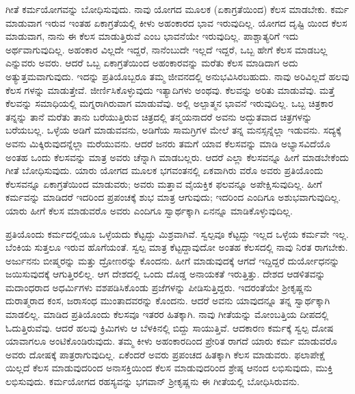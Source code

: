 ಗೀತೆ ಕರ್ಮಯೋಗವನ್ನು ಬೋಧಿಸುವುದು. ನಾವು ಯೋಗದ ಮೂಲಕ (ಏಕಾಗ್ರತೆಯಿಂದ) ಕೆಲಸ ಮಾಡಬೇಕು. ಕರ್ಮ ಮಾಡುವಾಗ ಇರುವ ಇಂತಹ ಏಕಾಗ್ರತೆಯಲ್ಲಿ ಕೀಳು ಅಹಂಕಾರದ ಭಾವ ಇರುವುದಿಲ್ಲ. ಯೋಗದ ದೃಷ್ಟಿ ಯಿಂದ ಕೆಲಸ ಮಾಡುವಾಗ, ನಾನು ಈ ಕೆಲಸ ಮಾಡುತ್ತಿರುವೆ ಎಂಬ ಭಾವನೆಯೇ ಇರುವುದಿಲ್ಲ. ಪಾಶ್ಚಾತ್ಯರಿಗೆ ಇದು ಅರ್ಥವಾಗುವುದಿಲ್ಲ. ಅಹಂಕಾರ ವಿಲ್ಲದೇ ಇದ್ದರೆ, ನಾನೆಂಬುದೇ ಇಲ್ಲದೆ ಇದ್ದರೆ, ಒಬ್ಬ ಹೇಗೆ ಕೆಲಸ ಮಾಡಬಲ್ಲ ಎನ್ನುವರು ಅವರು. ಆದರೆ ಒಬ್ಬ ಏಕಾಗ್ರತೆಯಿಂದ ಅಹಂಕಾರವನ್ನು ಮರೆತು ಕೆಲಸ ಮಾಡಿದಾಗ ಅದು ಅತ್ಯುತ್ತಮವಾಗುವುದು. ಇದನ್ನು ಪ್ರತಿಯೊಬ್ಬರೂ ತಮ್ಮ ಜೀವನದಲ್ಲಿ ಅನುಭವಿಸಿರಬಹುದು. ನಾವು ಅರಿವಿಲ್ಲದೆ ಹಲವು ಕೆಲಸ ಗಳನ್ನು ಮಾಡುತ್ತೇವೆ. ಜೀರ್ಣಿಸಿಕೊಳ್ಳುವುದು ಇತ್ಯಾದಿಗಳು ಅಂಥವು. ಕೆಲವನ್ನು ಅರಿತು ಮಾಡುವೆವು. ಮತ್ತೆ ಕೆಲವನ್ನು ಸಮಾಧಿಯಲ್ಲಿ ಮಗ್ನರಾಗಿರುವಾಗ ಮಾಡುವೆವು. ಅಲ್ಲಿ ಅಲ್ಪಾತ್ಮನ ಭಾವನೆ ಇರುವುದಿಲ್ಲ. ಒಬ್ಬ ಚಿತ್ರಕಾರ ತನ್ನನ್ನು ತಾನೆ ಮರೆತು ತಾನು ಬರೆಯುತ್ತಿರುವ ಚಿತ್ರದಲ್ಲಿ ತನ್ಮಯನಾದರೆ ಅವನು ಅದ್ಭುತವಾದ ಚಿತ್ರಗಳನ್ನು ಬರೆಯಬಲ್ಲ. ಒಳ್ಳೆಯ ಅಡಿಗೆ ಮಾಡುವವನು, ಅಡಿಗೆಯ ಸಾಮಗ್ರಿಗಳ ಮೇಲೆ ತನ್ನ ಮನಸ್ಸನ್ನೆಲ್ಲಾ ಇಡುವನು. ಸದ್ಯಕ್ಕೆ ಅವನು ಮಿಕ್ಕಿರುವುದನ್ನೆಲ್ಲಾ ಮರೆಯುವನು. ಆದರೆ ಜನರು ತಮಗೆ ಯಾವ ಕೆಲಸವನ್ನು ಮಾಡಿ ಅಭ್ಯಾಸವಿದೆಯೊ ಅಂತಹ ಒಂದು ಕೆಲಸವನ್ನು ಮಾತ್ರ ಅವರು ಚೆನ್ನಾಗಿ ಮಾಡಬಲ್ಲರು. ಆದರೆ ಎಲ್ಲಾ ಕೆಲಸವನ್ನೂ ಹೀಗೆ ಮಾಡಬೇಕೆಂದು ಗೀತೆ ಬೋಧಿಸುವುದು. ಯಾರು ಯೋಗದ ಮೂಲಕ ಭಗವಂತನಲ್ಲಿ ಏಕವಾಗಿರು ವರೊ ಅವರು ಪ್ರತಿಯೊಂದು ಕೆಲಸವನ್ನೂ ಏಕಾಗ್ರತೆಯಿಂದ ಮಾಡುವರು; ಅವರು ಮತ್ತಾವ ವೈಯಕ್ತಿಕ ಫಲವನ್ನೂ ಅಪೇಕ್ಷಿಸುವುದಿಲ್ಲ. ಹೀಗೆ ಕರ್ಮವನ್ನು ಮಾಡಿದರೆ ಇದರಿಂದ ಪ್ರಪಂಚಕ್ಕೆ ಶುಭ ಮಾತ್ರ ಆಗುವುದು; ಇದರಿಂದ ಎಂದಿಗೂ ಅಶುಭವಾಗುವುದಿಲ್ಲ. ಯಾರು ಹೀಗೆ ಕೆಲಸ ಮಾಡುವರೊ ಅವರು ಎಂದಿಗೂ ಸ್ವಾರ್ಥಕ್ಕಾಗಿ ಏನನ್ನೂ ಮಾಡಿಕೊಳ್ಳುವುದಿಲ್ಲ.

ಪ್ರತಿಯೊಂದು ಕರ್ಮದಲ್ಲಿಯೂ ಒಳ್ಳೆಯದು ಕೆಟ್ಟದ್ದು ಮಿಶ್ರವಾಗಿವೆ. ಸ್ವಲ್ಪವೂ ಕೆಟ್ಟದ್ದು ಇಲ್ಲದ ಒಳ್ಳೆಯ ಕರ್ಮವೇ ಇಲ್ಲ. ಬೆಂಕಿಯ ಸುತ್ತಲೂ ಇರುವ ಹೊಗೆಯಂತೆ. ಸ್ವಲ್ಪ ಮಾತ್ರ ಕೆಟ್ಟದ್ದಾವುದೋ ಅಂತಹ ಕೆಲಸದಲ್ಲಿ ನಾವು ನಿರತ ರಾಗಬೇಕು. ಅರ್ಜುನನು ಬೀಷ್ಮರನ್ನು ಮತ್ತು ದ್ರೋಣರನ್ನು ಕೊಂದನು. ಹೀಗೆ ಮಾಡುವುದಕ್ಕೆ ಆಗದೆ ಇದ್ದಿದ್ದರೆ ದುರ್ಯೋಧನನ್ನು ಜಯಿಸುವುದಕ್ಕೆ ಆಗುತ್ತಿರಲಿಲ್ಲ. ಆಗ ದೇಶದಲ್ಲಿ ಒಂದು ದೊಡ್ಡ ಅನಾಯಕತೆ ಇರುತ್ತಿತ್ತು. ದೇಶದ ಆಡಳಿತವನ್ನು ಮದಾಂಧರಾದ ಅಧರ್ಮಿಗಳು ವಶಪಡಿಸಿಕೊಂಡು ಪ್ರಜೆಗಳನ್ನು ಪೀಡಿಸುತ್ತಿದ್ದರು. ಇದರಂತೆಯೇ ಶ‍್ರೀಕೃಷ್ಣನು ದುರಾತ್ಮರಾದ ಕಂಸ, ಜರಾಸಂಧ ಮುಂತಾದವರನ್ನು ಕೊಂದನು. ಆದರೆ ಅವನು ಯಾವುದನ್ನೂ ತನ್ನ ಸ್ವಾರ್ಥಕ್ಕಾಗಿ ಮಾಡಲಿಲ್ಲ. ಮಾಡಿದ ಪ್ರತಿಯೊಂದು ಕೆಲಸವೂ ಇತರರ ಹಿತಕ್ಕಾಗಿ. ನಾವು ಗೀತೆಯನ್ನು ಮೋಂಬತ್ತಿಯ ದೀಪದಲ್ಲಿ ಓದುತ್ತಿರುವೆವು. ಆದರೆ ಹಲವು ಕ್ರಿಮಿಗಳು ಆ ಬೆಳಕಿನಲ್ಲಿ ಬಿದ್ದು ಸಾಯುತ್ತಿವೆ. ಆದಕಾರಣ ಕರ್ಮಕ್ಕೆ ಸ್ವಲ್ಪ ದೋಷ ಯಾವಾಗಲೂ ಅಂಟಿಕೊಂಡಿರುವುದು. ತಮ್ಮ ಕೀಳು ಅಹಂಕಾರದಿಂದ ಪ್ರೇರಿತ ರಾಗದೆ ಯಾರು ಕರ್ಮ ಮಾಡುವರೊ ಅವರು ದೋಷಕ್ಕೆ ಪಾತ್ರರಾಗುವುದಿಲ್ಲ. ಏಕೆಂದರೆ ಅವರು ಪ್ರಪಂಚದ ಹಿತಕ್ಕಾಗಿ ಕೆಲಸ ಮಾಡುವರು. ಫಲಾಪೇಕ್ಷೆ ಯಿಲ್ಲದೆ ಕೆಲಸ ಮಾಡುವುದರಿಂದ ಅನಾಸಕ್ತಿಯಿಂದ ಕೆಲಸ ಮಾಡುವುದರಿಂದ ಶ್ರೇಷ್ಠ ಆನಂದ ಲಭಿಸುವುದು, ಮುಕ್ತಿ ಲಭಿಸುವುದು. ಕರ್ಮಯೋಗದ ರಹಸ್ಯವನ್ನು ಭಗವಾನ್​ ಶ‍್ರೀಕೃಷ್ಣನು ಈ ಗೀತೆಯಲ್ಲಿ ಬೋಧಿಸಿರುವನು.

